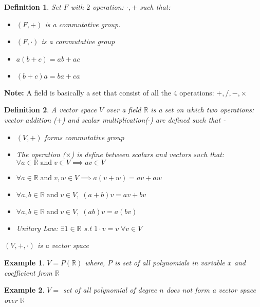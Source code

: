 \documentclass[12pt]{article}
\newcommand{\R}{\mathbb{R}}
\newtheorem*{defn}{Definition}
\newtheorem{ex}{Example}
\begin{document}
 

\rhead{\today}
 

\begin{defn}\normalfont
	Set $F$ with $2$ operation: $\cdot, +$ such that:
	\begin{itemize}
		\item $(F, +)$ is a commutative group.
		\item $(F, \cdot)$ is a commutative group
		\item $a(b+c) = ab+ac$
		\item $(b+c)a = ba+ca$
	\end{itemize}
\end{defn}

\textbf{Note: } A field is basically a set that consist of all the $4$ operations: $+,/,-,\times$

\begin{defn}\normalfont
	A vector space $V$ over a field $\R$ is a set on which two operations: vector addition ($+$) and scalar multiplication($\cdot$) are defined such that -
	\begin{itemize}
		\item $(V,+)$ forms commutative group
		\item The operation ($\times$) is define between scalars and vectors such that: 
		$\forall  a \in \R \;\text{and}\; v \in V \implies av \in V$ 
		\item $\forall a \in \R \;\text{and}\; v,w \in V \implies a(v+w)=av+aw$
		\item $\forall a,b \in \R \;\text{and}\; v \in V,\; (a+b)v = av+bv$
		\item $\forall a,b \in \R \;\text{and}\; v \in V,\; (ab)v = a(bv)$
		\item Unitary Law: $\exists 1\in \R$ s.t $1 \cdot v = v\; \forall v \in V$
	\end{itemize}
$(V, +, \cdot)$ is a vector space
\end{defn}

\begin{ex}\normalfont
	$V = P(\R)$ where, $P$ is set of all polynomials in variable $x$ and coefficient from $\R$
\end{ex}

\begin{ex}\normalfont
	$V =$ set of all polynomial of degree $n$ does not form a vector space over $\R$
\end{ex}
\end{document}
